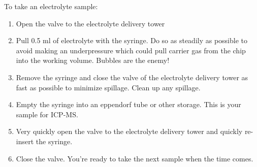 To take an electrolyte sample:
\begin{enumerate}
	\item Open the valve to the electrolyte delivery tower
	
	\item Pull 0.5 ml of electrolyte with the syringe. Do so as steadily as possible to avoid making an underpressure which could pull carrier gas from the chip into the working volume. Bubbles are the enemy!
	
	\item Remove the syringe and close the valve of the electrolyte delivery tower as fast as possible to minimize spillage. Clean up any spillage.
	
	\item Empty the syringe into an eppendorf tube or other storage. This is your sample for ICP-MS.
	
	\item Very quickly open the valve to the electrolyte delivery tower and quickly re-insert the syringe.
	
	\item Close the valve. You're ready to take the next sample when the time comes.
\end{enumerate}


